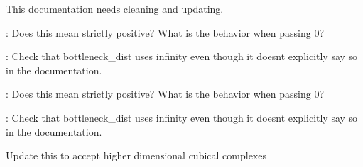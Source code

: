 
\begin{DoxyRefList}
\item[\label{todo__todo000001}%
\hypertarget{todo__todo000001}{}%
Member \hyperlink{namespaceteaspoon_1_1_t_d_a_1_1_distance_ad3481b3888962dbf302bacb9d9504e8b}{teaspoon\+:\+:T\+DA\+:\+:Distance.dgm\+Dist\+\_\+\+Hera} (D1, D2, wass\+Deg=\textquotesingle{}Bottleneck\textquotesingle{}, rel\+Error=None, internal\+\_\+p=None)]This documentation needs cleaning and updating.

\+: Does this mean strictly positive? What is the behavior when passing 0? 

\+: Check that bottleneck\+\_\+dist uses infinity even though it doesn\textquotesingle{}t explicitly say so in the documentation.

\+: Does this mean strictly positive? What is the behavior when passing 0? 

\+: Check that bottleneck\+\_\+dist uses infinity even though it doesn\textquotesingle{}t explicitly say so in the documentation. 
\item[\label{todo__todo000005}%
\hypertarget{todo__todo000005}{}%
Member \hyperlink{namespaceteaspoon_1_1_t_d_a_1_1_persistence_aa583aa9a694aeaa3983e77319ac68e84}{teaspoon\+:\+:T\+DA\+:\+:Persistence.Cubical\+\_\+\+Perseus} (M, num\+Digits=2, suppress\+Output=True)]Update this to accept higher dimensional cubical complexes 
\item[\label{todo__todo000004}%
\hypertarget{todo__todo000004}{}%
Member \hyperlink{namespaceteaspoon_1_1_t_d_a_1_1_persistence_a0660fcd00ca57001f21bfaaefb1da9c3}{teaspoon\+:\+:T\+DA\+:\+:Persistence.dist\+Mat\+\_\+\+Perseus} ()]
\end{DoxyRefList}